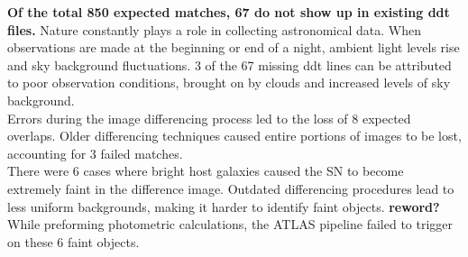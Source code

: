 
{\bf \indent Of the total 850 expected matches, 67 do not show up in existing ddt files.}
%
Nature constantly plays a role in collecting astronomical data. When 
observations are made at the beginning or end of a night, ambient light 
levels rise and sky background fluctuations. 3 of the 67 missing ddt 
lines can be attributed to poor observation conditions, brought on by 
clouds and increased levels of sky background.\\
%
%
\indent Errors during the image differencing process led to the loss of 8 
expected overlaps. Older differencing techniques caused entire portions 
of images to be lost, accounting for 3 failed matches.\\
%

\indent There were 6 cases where bright host galaxies caused the SN to become extremely 
faint in the difference image. Outdated differencing procedures lead to less 
uniform backgrounds, making it harder to identify faint objects. {\bf reword?} 
While preforming photometric calculations, the ATLAS pipeline failed to trigger 
on these 6 faint objects.\\
